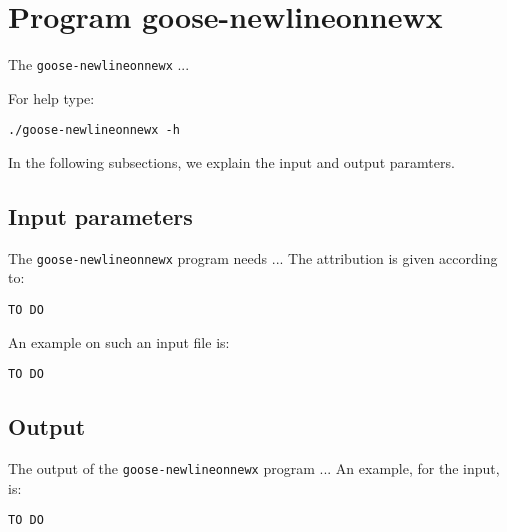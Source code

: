 \section{Program goose-newlineonnewx}
The \texttt{goose-newlineonnewx} ...

For help type:
\begin{lstlisting}
./goose-newlineonnewx -h
\end{lstlisting}
In the following subsections, we explain the input and output paramters.

\subsection*{Input parameters}

The \texttt{goose-newlineonnewx} program needs ...
The attribution is given according to:
\begin{lstlisting}
TO DO
\end{lstlisting}

An example on such an input file is:
\begin{lstlisting}
TO DO
\end{lstlisting}

\subsection*{Output}
The output of the \texttt{goose-newlineonnewx} program ...
An example, for the input, is:
\begin{lstlisting}
TO DO
\end{lstlisting}
